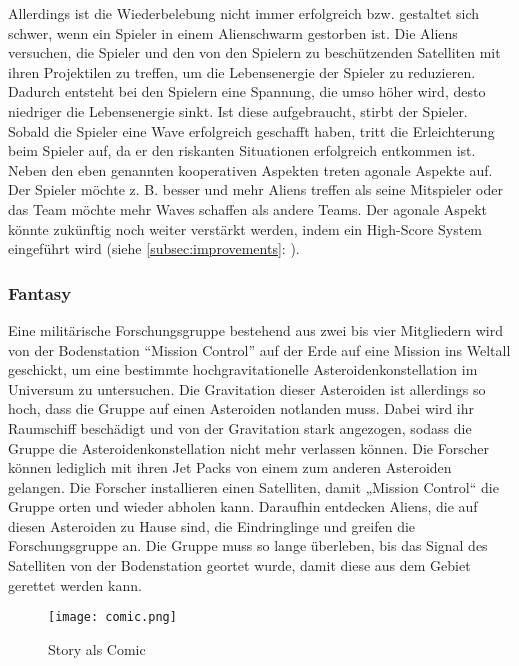 \documentclass[11pt]{scrartcl}
\begin{document}
Allerdings ist die Wiederbelebung nicht immer erfolgreich bzw. gestaltet sich schwer, wenn ein Spieler in einem Alienschwarm gestorben ist. Die Aliens versuchen, die Spieler und den von den Spielern zu beschützenden Satelliten mit ihren Projektilen zu treffen, um die Lebensenergie der Spieler zu reduzieren. Dadurch entsteht bei den Spielern eine Spannung, die umso höher wird, desto niedriger die Lebensenergie sinkt. Ist diese aufgebraucht, stirbt der Spieler. Sobald die Spieler eine Wave erfolgreich geschafft haben, tritt die Erleichterung beim Spieler auf, da er den riskanten Situationen erfolgreich entkommen ist. Neben den eben genannten kooperativen Aspekten treten agonale Aspekte auf. Der Spieler möchte z. B. besser und mehr Aliens treffen als seine Mitspieler oder das Team möchte mehr Waves schaffen als andere Teams. Der agonale Aspekt könnte zukünftig noch weiter verstärkt werden, indem ein High-Score System eingeführt wird (siehe \autoref{subsec:improvements}: ). 

\newpage
\subsubsection{Fantasy}
\label{subsec:fan}
Eine militärische Forschungsgruppe bestehend aus zwei bis vier Mitgliedern wird von der Bodenstation “Mission Control” auf der Erde auf eine Mission ins Weltall geschickt, um eine bestimmte hochgravitationelle Asteroidenkonstellation im Universum zu untersuchen. Die Gravitation dieser Asteroiden ist allerdings so hoch, dass die Gruppe auf einen Asteroiden notlanden muss. Dabei wird ihr Raumschiff beschädigt und von der Gravitation stark angezogen, sodass die Gruppe die Asteroidenkonstellation nicht mehr verlassen können. Die Forscher können lediglich mit ihren Jet Packs von einem zum anderen Asteroiden gelangen. Die Forscher installieren einen Satelliten, damit „Mission Control“ die Gruppe orten und wieder abholen kann. Daraufhin entdecken Aliens, die auf diesen Asteroiden zu Hause sind, die Eindringlinge und greifen die Forschungsgruppe an. Die Gruppe muss so lange überleben, bis das Signal des Satelliten von der Bodenstation geortet wurde, damit diese aus dem Gebiet gerettet werden kann.

\begin{figure}[htp]
	\centering
	\texttt{[image: comic.png]}
	\caption{Story als Comic}
	\label{fig:comic}
\end{figure}
\end{document}
